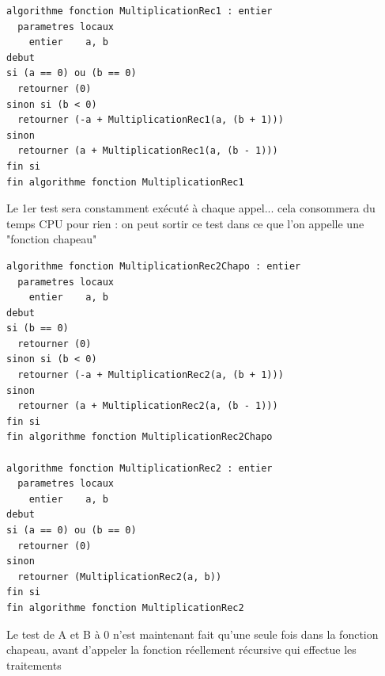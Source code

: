 \documentclass[11pt,a4paper]{article}
\begin{document}

\begin{table}[ht!]
  \centering
\begin{lstlisting}[style=algorithmique]
algorithme fonction MultiplicationRec1 : entier
  parametres locaux
    entier    a, b
debut
si (a == 0) ou (b == 0)
  retourner (0)
sinon si (b < 0)
  retourner (-a + MultiplicationRec1(a, (b + 1)))
sinon
  retourner (a + MultiplicationRec1(a, (b - 1)))
fin si
fin algorithme fonction MultiplicationRec1 \end{lstlisting}
  \caption{Le 1er test sera constamment exécuté à chaque appel... cela consommera du temps CPU pour rien : on peut sortir ce test dans ce que l'on appelle une "fonction chapeau"}
\end{table}


\begin{table}[ht!]
  \centering
\begin{lstlisting}[style=algorithmique]
algorithme fonction MultiplicationRec2Chapo : entier
  parametres locaux
    entier    a, b
debut
si (b == 0)
  retourner (0)
sinon si (b < 0)
  retourner (-a + MultiplicationRec2(a, (b + 1)))
sinon
  retourner (a + MultiplicationRec2(a, (b - 1)))
fin si
fin algorithme fonction MultiplicationRec2Chapo

algorithme fonction MultiplicationRec2 : entier
  parametres locaux
    entier    a, b
debut
si (a == 0) ou (b == 0)
  retourner (0)
sinon
  retourner (MultiplicationRec2(a, b))
fin si
fin algorithme fonction MultiplicationRec2 \end{lstlisting}
  \caption{Le test de A et B à 0 n'est maintenant fait qu'une seule fois dans la fonction chapeau, avant d'appeler la fonction réellement récursive qui effectue les traitements}
\end{table}

\bigskip

\pagebreak


\end{document}
